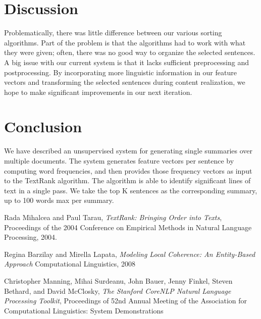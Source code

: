 \documentclass[11pt]{article}
\begin{document}
\section{Discussion}
Problematically, there was little difference between our various sorting algorithms. Part of the problem is that the algorithms had to work with what they were given; often, there was no good way to organize the selected sentences.\\
A big issue with our current system is that it lacks sufficient preprocessing and postprocessing. By incorporating more linguistic information in our feature vectors and transforming the selected sentences during content realization, we hope to make significant improvements in our next iteration.\\


\section{Conclusion}
 We have described an unsupervised system for generating single summaries over multiple documents. The system generates feature vectors per sentence by computing word frequencies, and then provides those frequency vectors as input to the TextRank algorithm. The algorithm is able to identify significant lines of text in a single pass. We take the top K sentences as the corresponding summary, up to 100 words max per summary.

%
%

\begin{thebibliography}{}

	Rada Mihalcea and Paul Tarau,
	\textit{TextRank: Bringing Order into Texts},
	Proceedings of the 2004 Conference on Empirical Methods in Natural Language Processing,
	2004.

    Regina Barzilay and Mirella Lapata,
    \textit{Modeling Local Coherence: An Entity-Based Approach}
    Computational Linguistics, 
    2008

    Christopher Manning, Mihai Surdeanu, John Bauer, Jenny Finkel, Steven Bethard, and David McClosky,
    \textit{The Stanford CoreNLP Natural Language Processing Toolkit},
    Proceedings of 52nd Annual Meeting of the Association for Computational Linguistics: System Demonstrations
\end{thebibliography}
\end{document}
